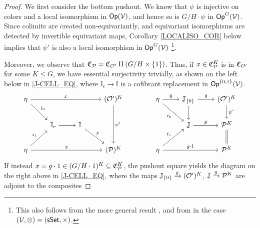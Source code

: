 \documentclass[a4paper,10pt
,draft
]{article}%
\renewcommand{\F}{\mathcal F}
\newcommand{\I}{\mathbb I}
\newcommand{\J}{\mathbb J}
\renewcommand{\1}{\eta}%
\begin{document}
\begin{proof}
      We first consider the bottom pushout.
      We know that $\psi$ is injective on colors and a local isomorphism in $\Op(\V)$,
      and hence so is $G/H \cdot \psi$ in $\Op^G(\V)$.
      Since colimits are created non-equivariantly, and equivariant isomorphisms are detected by invertible equivariant maps,
      Corollary \ref{LOCALISO_COR} below implies that $\psi'$ is also a local isomorphism in $\Op^G(\V)$ \footnote{
        This also follows from the more general result \cite[Prop. B.22]{Cav},
        and from \cite[Prop. 1.28]{CM13b} in the case $(\V, \otimes) = (\sSet, \times)$.
      }.
      
      Moreover, we observe that $\C_{\P} = \C_{\O'} \amalg (G/H \times \set{1})$.
      Thus, if $x \in \C_{\P}^K$ is in $\C_{\O'}$ for some $K \leq G$, we have essential surjectivity trivially,
      as shown on the left below in \eqref{J-CELL_EQ},
      where $\I_c \to \I$ is a cofibrant replacement in $\Op^{\set{0,1}}(\V)$.
      \begin{equation}
            \label{J-CELL_EQ}
            \begin{tikzcd}
                  \1 \arrow[rrr, "x"] \arrow[dr, " i_0"]
                  &&&
                  (\O')^K \arrow[dd, "\psi'"]
                  &[15pt] %
                  \1 \arrow[r, "0"] \arrow[dr, "i_0"']
                  &
                  \J_{\set{0}} \arrow[d] \arrow[r, "g"]
                  &
                  (\O')^K \arrow[d, "{\psi'}"]
                  \\
                  &
                  \I_c \arrow[r]
                  &
                  \I \arrow[dr, "x"]
                  &
                  & %
                  &
                  \J \arrow[r, "g"]
                  &
                  \P^K \arrow[d, equal]
                  \\
                  \1 \arrow[ur, " i_1"] \arrow[rrr,"x"]
                  &&&
                  (\P)^K
                  & %
                  \1 \arrow[rr, "g \cdot 1"] \arrow[ur, "i_1"]
                  &&
                  \P^K
            \end{tikzcd}
      \end{equation}
      If instead $x  = g \cdot 1 \in (G/H \cdot 1)^K \subseteq \mathfrak C_\P^K$,
      the pushout square yields the diagram on the right above in \eqref{J-CELL_EQ},
      where the maps $\J_{\set{0}} \xrightarrow{g} (\O')^K$, $\J \xrightarrow{g} \P^K$ are adjoint to the composites

\end{proof}
\end{document}
